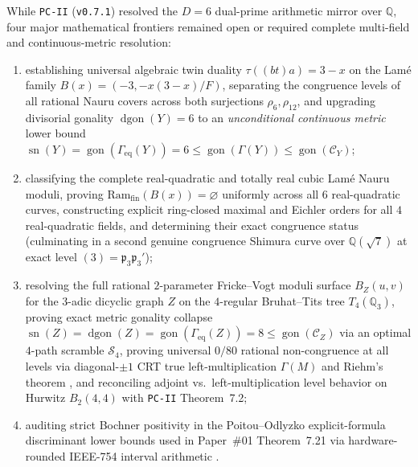 \documentclass[11pt]{amsart}
\numberwithin{equation}{section}
\theoremstyle{plain}
\theoremstyle{definition}\newtheorem{definition}[theorem]{Definition}
\theoremstyle{remark}\newtheorem{remark}[theorem]{Remark}
\newcommand{\Q}{\mathbb{Q}}
\newcommand{\calC}{\mathcal{C}}
\newcommand{\calS}{\mathcal{S}}
\newcommand{\frp}{\mathfrak{p}}
\newcommand{\Ram}{\mathrm{Ram}}
\newcommand{\gon}{\operatorname{gon}}
\newcommand{\dgon}{\operatorname{dgon}}
\newcommand{\sn}{\operatorname{sn}}
\begin{document}
While \texttt{PC-II} (\texttt{v0.7.1}) resolved the $D=6$ dual-prime arithmetic mirror over $\Q$, four major mathematical frontiers remained open or required complete multi-field and continuous-metric resolution:
\begin{enumerate}[label=(\arabic*),nosep]
\item establishing universal algebraic twin duality $\tau((bt)a) = 3 - x$ on the Lam\'e family $B(x) = (-3, -x(3-x)/F)$, separating the congruence levels of all rational Nauru covers across both surjections $\rho_6, \rho_{12}$, and upgrading divisorial gonality $\dgon(Y) = 6$ to an \emph{unconditional continuous metric} lower bound $\sn(Y) = \gon(\Gamma_{\mathrm{eq}}(Y)) = 6 \le \gon(\Gamma(Y)) \le \gon(\calC_Y)$;
\item classifying the complete real-quadratic and totally real cubic Lam\'e Nauru moduli, proving $\Ram_{\mathrm{fin}}(B(x)) = \varnothing$ uniformly across all $6$ real-quadratic curves, constructing explicit ring-closed maximal and Eichler orders for all $4$ real-quadratic fields, and determining their exact congruence status (culminating in a second genuine congruence Shimura curve over $\Q(\sqrt{7})$ at exact level $(3)=\frp_3\frp_3'$);
\item resolving the full rational $2$-parameter Fricke--Vogt moduli surface $B_Z(u,v)$ for the $3$-adic dicyclic graph $Z$ on the $4$-regular Bruhat--Tits tree $T_4(\Q_3)$, proving exact metric gonality collapse $\sn(Z) = \dgon(Z) = \gon(\Gamma_{\mathrm{eq}}(Z)) = 8 \le \gon(\calC_Z)$ via an optimal $4$-path scramble $\calS_4$, proving universal $0/80$ rational non-congruence at all levels via diagonal-$\pm 1$ CRT true left-multiplication $\Gamma(M)$ and Riehm's theorem \cite{riehm1970}, and reconciling adjoint vs.\ left-multiplication level behavior on Hurwitz $B_2(4,4)$ with \texttt{PC-II} Theorem~7.2;
\item auditing strict Bochner positivity in the Poitou--Odlyzko explicit-formula discriminant lower bounds \cite{poitou1977,odlyzko1990} used in Paper~\#01 Theorem~7.21 via hardware-rounded IEEE-754 interval arithmetic \cite{moore1966}.
\end{enumerate}
\end{document}

